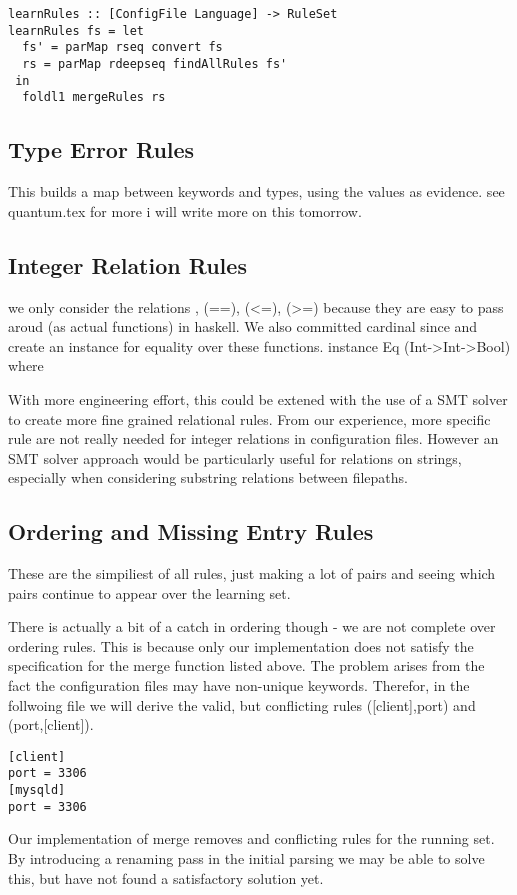 \begin{lstlisting}
learnRules :: [ConfigFile Language] -> RuleSet
learnRules fs = let
  fs' = parMap rseq convert fs
  rs = parMap rdeepseq findAllRules fs'
 in
  foldl1 mergeRules rs
\end{lstlisting}

\subsection{Type Error Rules}
This builds a map between keywords and types, using the values as evidence.
see quantum.tex for more
i will write more on this tomorrow.

\subsection{Integer Relation Rules}
we only consider the relations , (==), (<=), (>=) because they are easy to pass aroud (as actual functions) in haskell.
We also committed cardinal since and create an instance for equality over these functions.
instance Eq (Int->Int->Bool) where

With more engineering effort, this could be extened with the use of a SMT solver to create more fine grained relational rules.
From our experience, more specific rule are not really needed for integer relations in configuration files.
However an SMT solver approach would be particularly useful for relations on strings, especially when considering substring relations between filepaths.

\subsection{Ordering and Missing Entry Rules}
These are the simpiliest of all rules, just making a lot of pairs and seeing which pairs continue to appear over the learning set.

There is actually a bit of a catch in ordering though - we are not complete over ordering rules.
This is because only our implementation does not satisfy the specification for the merge function listed above.
The problem arises from the fact the configuration files may have non-unique keywords.
Therefor, in the follwoing file we will derive the valid, but conflicting rules ([client],port) and (port,[client]).
\begin{verbatim}
[client]
port = 3306
[mysqld]
port = 3306
\end{verbatim}
Our implementation of merge removes and conflicting rules for the running set.
By introducing a renaming pass in the initial parsing we may be able to solve this, but have not found a satisfactory solution yet.
